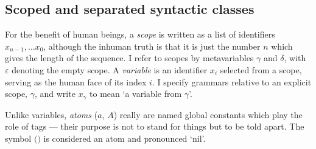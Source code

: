 \documentclass{jfp1}
\newcommand{\emp}{\varepsilon}
\newcommand{\Pa}[1]{\texttt{(}#1\texttt{)}}
\newcommand{\Se}{\mathsf}
\begin{document}
\subsection{Scoped and separated syntactic classes}

For the benefit of human beings, a \emph{scope} is written as a list of identifiers $x_{n-1},\ldots x_0$, although the inhuman truth is that it is just the number $n$
which gives the length of the sequence. I refer to scopes by
metavariables $\gamma$ and $\delta$, with $\emp$ denoting the empty
scope. A \emph{variable} is an identifier $x_i$ selected from
a scope, serving as the human face of its index $i$. I specify grammars
relative to an explicit scope, $\gamma$, and write $x_\gamma$ to
mean `a variable from $\gamma$'.

Unlike variables, \emph{atoms} ($a$, $A$) really are named global
constants which play the role of tags --- their purpose is not
to stand for things but to be told apart. The symbol $\Pa{}$ is
considered an atom and pronounced `nil'.

\newcommand{\lib}{\Se{lib}}
\newcommand{\ess}{\Se{ess}}
\newcommand{\cons}{\Se{cons}}
\newcommand{\comp}{\Se{comp}}
\end{document}
